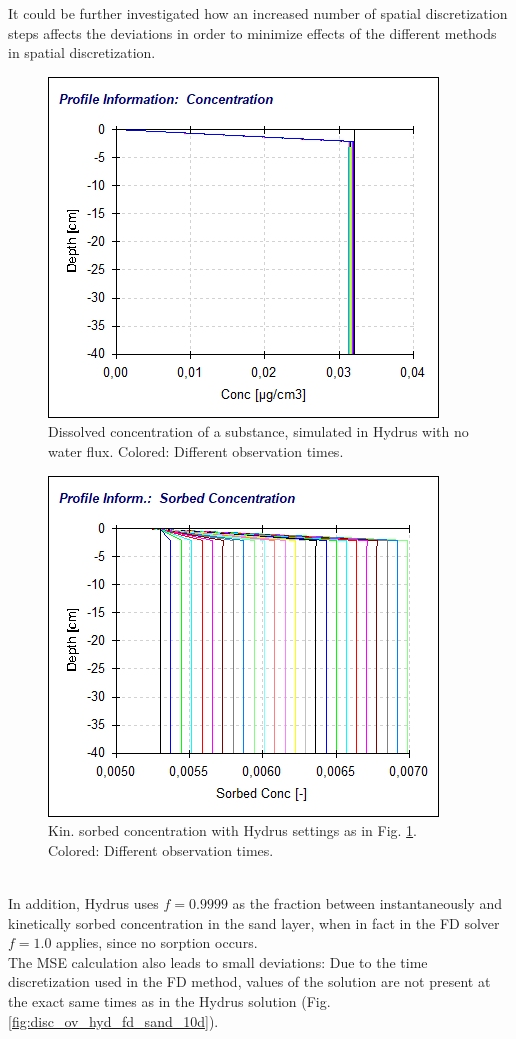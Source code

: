 It could be further investigated how an increased number of spatial discretization steps affects the deviations in order to minimize effects of the different methods in spatial discretization.
\begin{figure}
	\centering
	\includegraphics[scale=0.7]{images/ZeroTransport_c.jpg}
\caption[Course of the dissolved concentration in Hydrus]{Dissolved concentration of a substance, simulated in Hydrus with no water flux. Colored: Different observation times.}
\label{fig:hyd_zero_transp_c}
\end{figure}
\begin{figure}
	\centering
	\includegraphics[scale=0.7]{images/ZeroTransport.jpg}
\caption[Course of the kinetically sorbed concentration in Hydrus]{Kin. sorbed concentration with Hydrus settings as in Fig.  \ref{fig:hyd_zero_transp_c}. Colored: Different observation times.}
\label{fig:hyd_zero_transp_sk}
\end{figure}
\\
In addition, Hydrus uses $f=0.9999$ as the fraction between instantaneously and kinetically sorbed concentration in the sand layer, when in fact in the FD solver $f=1.0$ applies, since no sorption occurs.\\
The MSE calculation also leads to small deviations: Due to the time discretization used in the FD method, values of the solution are not present at the exact same times as in the Hydrus solution (Fig. \ref{fig:disc_ov_hyd_fd_sand_10d}).
